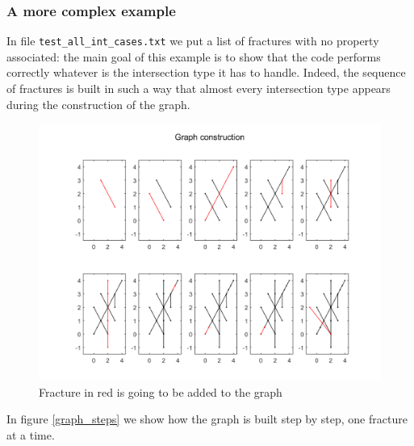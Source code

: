 \documentclass[11pt]{article} %
\begin{document}
	\subsubsection{A more complex example}
		In file \texttt{test\_all\_int\_cases.txt} we put a list of fractures with no property associated: the main goal of this example is to show that the code performs correctly whatever is the intersection type it has to handle. Indeed, the sequence of fractures is built in such a way that almost every intersection type appears during the construction of the graph. 
				\begin{figure}
					\centering 
					\includegraphics[width=1\textwidth]{graph_building_process}
					\caption{Fracture in red is going to be added to the graph}
					\label{fig:graph_steps}
				\end{figure}
		In figure \ref{graph_steps} we show how the graph is built step by step, one fracture at a time.
		
\end{document}
